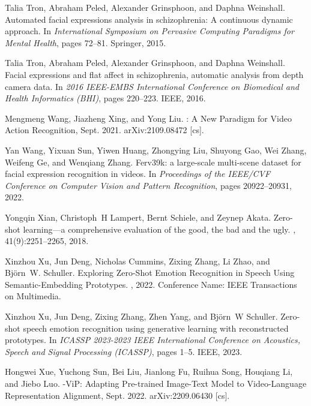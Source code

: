 \documentclass[10pt,twocolumn,letterpaper]{article}
\begin{document}
{\begin{thebibliography}{10}
Talia Tron, Abraham Peled, Alexander Grinsphoon, and Daphna Weinshall.
\newblock Automated facial expressions analysis in schizophrenia: {A}
  continuous dynamic approach.
\newblock In {\em International {Symposium} on {Pervasive} {Computing}
  {Paradigms} for {Mental} {Health}}, pages 72--81. Springer, 2015.

Talia Tron, Abraham Peled, Alexander Grinsphoon, and Daphna Weinshall.
\newblock Facial expressions and flat affect in schizophrenia, automatic
  analysis from depth camera data.
\newblock In {\em 2016 {IEEE}-{EMBS} {International} {Conference} on
  {Biomedical} and {Health} {Informatics} ({BHI})}, pages 220--223. IEEE, 2016.

Mengmeng Wang, Jiazheng Xing, and Yong Liu.
: {A} {New} {Paradigm} for {Video} {Action}
  {Recognition}, Sept. 2021.
\newblock arXiv:2109.08472 [cs].

Yan Wang, Yixuan Sun, Yiwen Huang, Zhongying Liu, Shuyong Gao, Wei Zhang,
  Weifeng Ge, and Wenqiang Zhang.
\newblock Ferv39k: a large-scale multi-scene dataset for facial expression
  recognition in videos.
\newblock In {\em Proceedings of the IEEE/CVF Conference on Computer Vision and
  Pattern Recognition}, pages 20922--20931, 2022.

Yongqin Xian, Christoph~H Lampert, Bernt Schiele, and Zeynep Akata.
\newblock Zero-shot learning—a comprehensive evaluation of the good, the bad
  and the ugly.
,
  41(9):2251--2265, 2018.

Xinzhou Xu, Jun Deng, Nicholas Cummins, Zixing Zhang, Li Zhao, and Björn~W.
  Schuller.
\newblock Exploring {Zero}-{Shot} {Emotion} {Recognition} in {Speech} {Using}
  {Semantic}-{Embedding} {Prototypes}.
, 2022.
\newblock Conference Name: IEEE Transactions on Multimedia.

Xinzhou Xu, Jun Deng, Zixing Zhang, Zhen Yang, and Bj{\"o}rn~W Schuller.
\newblock Zero-shot speech emotion recognition using generative learning with
  reconstructed prototypes.
\newblock In {\em ICASSP 2023-2023 IEEE International Conference on Acoustics,
  Speech and Signal Processing (ICASSP)}, pages 1--5. IEEE, 2023.

Hongwei Xue, Yuchong Sun, Bei Liu, Jianlong Fu, Ruihua Song, Houqiang Li, and
  Jiebo Luo.
-{ViP}: {Adapting} {Pre}-trained {Image}-{Text} {Model} to
  {Video}-{Language} {Representation} {Alignment}, Sept. 2022.
\newblock arXiv:2209.06430 [cs].


\end{thebibliography}}
\end{document}
